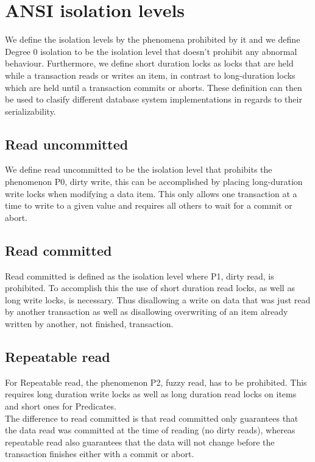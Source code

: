 \documentclass[sigconf, review=true]{acmart}
\begin{document}
\section{ANSI isolation levels}
We define the isolation levels by the phenomena prohibited by it and we define
Degree 0 isolation to be the isolation level that doesn’t prohibit any abnormal
behaviour. Furthermore, we define short duration locks as locks that are held
while a transaction reads or writes an item, in contrast to long-duration locks which are
held until a transaction commits or aborts.
These definition can then be used to clasify different database system implementations in
regards to their serializability.

\subsection{Read uncommitted}
We define read uncommitted to be the isolation level that prohibits the phenomenon
P0, dirty write, this can be accomplished by placing long-duration write locks when modifying a data item.
This only allows one transaction at a time to write to a given value and requires all others to wait for a commit or abort.

\subsection{Read committed}
Read committed is defined as the isolation level where P1, dirty read, is prohibited.
To accomplish this the use of short duration read locks, as well as long write locks, is
necessary. Thus disallowing a write on data that was just read by another transaction as
well as disallowing overwriting of an item already written by another, not finished, transaction.

\subsection{Repeatable read}
For Repeatable read, the phenomenon P2, fuzzy read, has to be prohibited.
This requires long duration write locks as well as long duration read locks on
items and short ones for Predicates.\\
The difference to read committed is that read committed only guarantees that
the data read was committed at the time of reading (no dirty reads), whereas
repeatable read also guarantees that the data will not change before the
transaction finishes either with a commit or abort.
\end{document}
